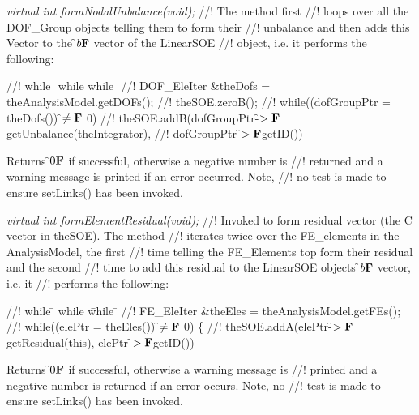 {\em virtual int formNodalUnbalance(void);}
//! The method first
//! loops over all the DOF\_Group objects telling them to form their
//! unbalance and then adds this Vector to the \f$b{\bf F}$ vector of the LinearSOE
//! object, i.e. it performs the following:
\begin{tabbing}
//! while \= \+ while \= while \= \kill
//! DOF\_EleIter \&theDofs = theAnalysisModel.getDOFs();
//! theSOE.zeroB();
//! while((dofGroupPtr = theDofs()) \f$\neq{\bf F}$ 0) \+
//! theSOE.addB(dofGroupPtr-\f$>{\bf F}$getUnbalance(theIntegrator),
//! dofGroupPtr-\f$>{\bf F}$getID())
\end{tabbing}
\noindent Returns \f$0{\bf F}$ if successful, otherwise a  negative number is
//! returned and a warning message is printed if an error occurred. Note,
//! no test is made to ensure setLinks() has been invoked.


{\em virtual int formElementResidual(void);}
//! Invoked to form residual vector (the C vector in theSOE). The method
//! iterates twice over the FE\_elements in the AnalysisModel, the first
//! time telling the FE\_Elements top form their residual and the second
//! time to add this residual to the LinearSOE objects \f$b{\bf F}$ vector, i.e. it
//! performs the following:
\begin{tabbing}
//! while \= \+ while \= while \= \kill
//! FE\_EleIter \&theEles = theAnalysisModel.getFEs();
//! while((elePtr = theEles()) \f$\neq{\bf F}$ 0) \{ \+
//! theSOE.addA(elePtr-\f$>{\bf F}$getResidual(this), elePtr-\f$>{\bf F}$getID()) \+ 
\end{tabbing}
\noindent Returns \f$0{\bf F}$ if successful, otherwise a warning message is
//! printed and a negative number is returned if an error occurs. Note, no
//! test is made to ensure setLinks() has been invoked.




